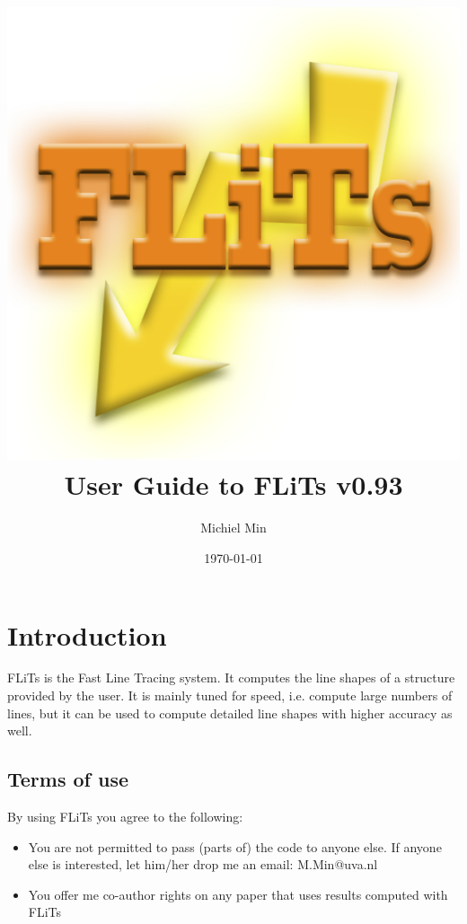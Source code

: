 \documentclass[12pt]{article}
\begin{document}
\title{\includegraphics[width=0.9\hsize]{Logo_FLiTs}\\User Guide to FLiTs v0.93}
\author{Michiel Min}
\date{\today}
\maketitle

\section{Introduction}

FLiTs is the Fast Line Tracing system. It computes the line shapes of a structure provided by the user. It is mainly tuned for speed, i.e. compute large numbers of lines, but it can be used to compute detailed line shapes with higher accuracy as well.

\subsection{Terms of use}

By using FLiTs you agree to the following:
\begin{itemize}
\item You are not permitted to pass (parts of) the code to anyone else. If anyone else is interested, let him/her drop me an email: M.Min@uva.nl
\item You offer me co-author rights on any paper that uses results computed with FLiTs
\end{itemize}
\end{document}
